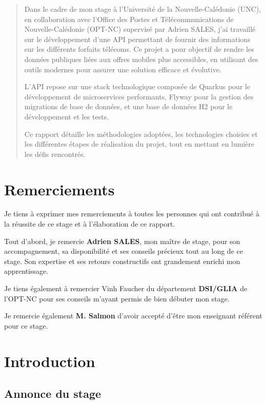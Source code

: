 \documentclass{article}
\begin{document}
	\newpage
	\begin{abstract}
		Dans le cadre de mon stage à l'Université de la Nouvelle-Calédonie (UNC), en collaboration avec l'Office des Postes et Télécommunications de Nouvelle-Calédonie (OPT-NC) supervisé par Adrien SALES, j'ai travaillé sur le développement d'une API permettant de fournir des informations sur les différents forfaits télécoms. Ce projet a pour objectif de rendre les données publiques liées aux offres mobiles plus accessibles, en utilisant des outils modernes pour assurer une solution efficace et évolutive.
		
		L'API repose sur une stack technologique composée de Quarkus pour le développement de microservices performants, Flyway pour la gestion des migrations de base de données, et une base de données H2 pour le développement et les tests. 
		
		Ce rapport détaille les méthodologies adoptées, les technologies choisies et les différentes étapes de réalisation du projet, tout en mettant en lumière les défis rencontrés.
	\end{abstract}
	\newpage
	\section*{Remerciements}
	
	Je tiens à exprimer mes remerciements à toutes les personnes qui ont contribué à la réussite de ce stage et à l’élaboration de ce rapport.
	
	Tout d’abord, je remercie \textbf{Adrien SALES}, mon maître de stage, pour son accompagnement, sa disponibilité et ses conseils précieux tout au long de ce stage. Son expertise et ses retours constructifs ont grandement enrichi mon apprentissage.
	
	Je tiens également à remercier Vinh Faucher du département \textbf{DSI/GLIA} de l’OPT-NC pour ses conseils m'ayant permis de bien débuter mon stage.
	
	Je remercie également \textbf{M. Salmon} d’avoir accepté d’être mon enseignant référent pour ce stage.
		
	\newpage
	\tableofcontents
	\newpage
	\section{Introduction}
	
	\subsection{Annonce du stage}
	
\end{document}
